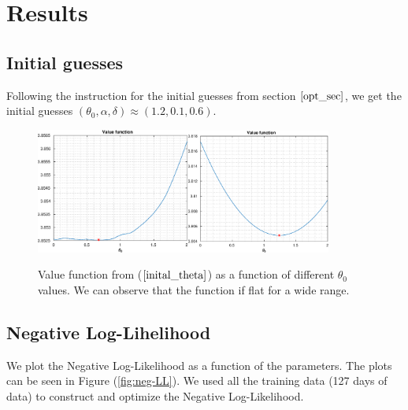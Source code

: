 \documentclass[11pt]{article}
\theoremstyle{definition}
\begin{document}
\section{Results} \label{Section_7}

\subsection{Initial guesses}

Following the instruction for the initial guesses from section $\ref{opt_sec}$, we get the initial guesses $(\theta_0,\alpha,\delta)\approx(1.2,0.1,0.6)$.

\begin{figure}[H]
\centering
\includegraphics[width=0.45\textwidth]{plots/initial_guess/initial_theta_1.eps}\quad\includegraphics[width=0.42\textwidth]{plots/initial_guess/initial_theta_2.eps}
\caption{Value function from ($\ref{inital_theta}$) as a function of different $\theta_0$ values. We can observe that the function if flat for a wide range.}
\end{figure}

\subsection{Negative Log-Lihelihood}

We plot the Negative Log-Likelihood as a function of the parameters. The plots can be seen in Figure (\ref{fig:neg-LL}). We used all the training data (127 days of data) to construct and optimize the Negative Log-Likelihood.
\end{document}
